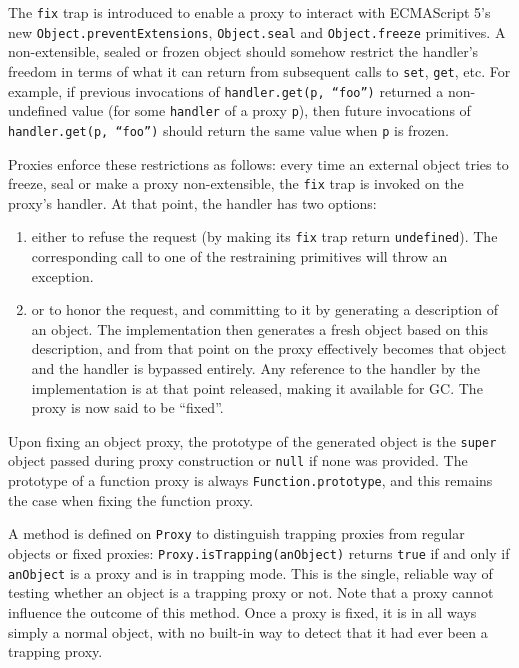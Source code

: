 \documentclass[10pt,legalpaper]{article}
\begin{document}
The \texttt{fix} trap is introduced to enable a proxy to interact with ECMAScript 5's new \texttt{Object.preventExtensions}, \texttt{Object.seal} and \texttt{Object.freeze} primitives. A non-extensible, sealed or frozen object should somehow restrict the handler’s freedom in terms of what it can return from subsequent calls to \texttt{set}, \texttt{get}, etc. For example, if previous invocations of \texttt{handler.get(p, ``foo'')} returned a non-undefined value (for some \texttt{handler} of a proxy \texttt{p}), then future invocations of \texttt{handler.get(p, ``foo'')} should return the same value when \texttt{p} is frozen.

Proxies enforce these restrictions as follows: every time an external object tries to freeze, seal or make a proxy non-extensible, the \texttt{fix} trap is invoked on the proxy’s handler. At that point, the handler has two options:
\begin{enumerate}
  \item either to refuse the request (by making its \texttt{fix} trap return \texttt{undefined}). The corresponding call to one of the restraining primitives will throw an exception.
  \item or to honor the request, and committing to it by generating a description of an object. The implementation then generates a fresh object based on this description, and from that point on the proxy effectively becomes that object and the handler is bypassed entirely. Any reference to the handler by the implementation is at that point released, making it available for GC. The proxy is now said to be ``fixed''.  
\end{enumerate}

Upon fixing an object proxy, the prototype of the generated object is the \texttt{super} object passed during proxy construction or \texttt{null} if none was provided. The prototype of a function proxy is always \texttt{Function.prototype}, and this remains the case when fixing the function proxy.


A method is defined on \texttt{Proxy} to distinguish trapping proxies from regular objects or fixed proxies:
\texttt{Proxy.isTrapping(anObject)} returns \texttt{true} if and only if \texttt{anObject} is a proxy and is in trapping mode. This is the single, reliable way of testing whether an object is a trapping proxy or not. Note that a proxy cannot influence the outcome of this method. Once a proxy is fixed, it is in all ways simply a normal object, with no built-in way to detect that it had ever been a trapping proxy.
\end{document}
